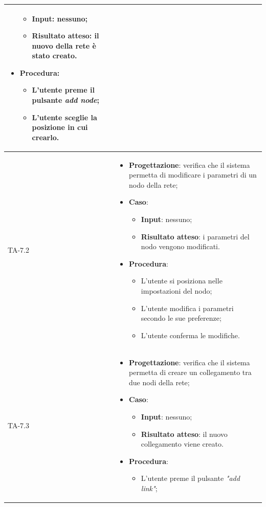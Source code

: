 \begin{longtable}{|C{2.5cm}|C{13cm}|}
\begin{itemize}
\begin{itemize}
		\item \textbf{Input}: nessuno;
		\item \textbf{Risultato atteso}: il nuovo della rete è stato creato.
	\end{itemize}
	\item \textbf{Procedura}:
	\begin{itemize}
		\item L'utente preme il pulsante \emph{add node};
		\item L'utente sceglie la posizione in cui crearlo.
	\end{itemize} 
\end{itemize} \\
\hline
{TA-7.2} &
\begin{itemize}
	\item \textbf{Progettazione}: verifica che il sistema permetta di modificare i parametri di un nodo della rete;
	\item \textbf{Caso}: 
	\begin{itemize}
		\item \textbf{Input}: nessuno;
		\item \textbf{Risultato atteso}: i parametri del nodo vengono modificati.
	\end{itemize}
	\item \textbf{Procedura}:
	\begin{itemize}
		\item L'utente si posiziona nelle impostazioni del nodo;
		\item L'utente modifica i parametri secondo le sue preferenze;
		\item L'utente conferma le modifiche.
	\end{itemize} 
\end{itemize} \\
\hline
{TA-7.3} &
\begin{itemize}
	\item \textbf{Progettazione}: verifica che il sistema permetta di creare un collegamento tra due nodi della rete;
	\item \textbf{Caso}: 
	\begin{itemize}
		\item \textbf{Input}: nessuno;
		\item \textbf{Risultato atteso}: il nuovo collegamento viene creato.
	\end{itemize}
	\item \textbf{Procedura}:
	\begin{itemize}
		\item L'utente preme il pulsante \emph{"add link"};

\end{itemize}
\end{itemize}
\end{longtable}
